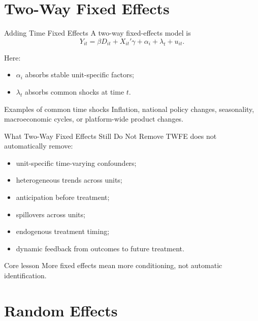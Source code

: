 \documentclass[aspectratio=169,11pt]{beamer}
\begin{document}
\section{Two-Way Fixed Effects}

\begin{frame}{Adding Time Fixed Effects}
A two-way fixed-effects model is
\[
Y_{it}=\beta D_{it}+X_{it}'\gamma+\alpha_i+\lambda_t+u_{it}.
\]

Here:
\begin{itemize}
\item \(\alpha_i\) absorbs stable unit-specific factors;
\item \(\lambda_t\) absorbs common shocks at time \(t\).
\end{itemize}

\begin{block}{Examples of common time shocks}
Inflation, national policy changes, seasonality, macroeconomic cycles, or platform-wide product changes.
\end{block}
\end{frame}

\begin{frame}{What Two-Way Fixed Effects Still Do Not Remove}
TWFE does not automatically remove:
\begin{itemize}
\item unit-specific time-varying confounders;
\item heterogeneous trends across units;
\item anticipation before treatment;
\item spillovers across units;
\item endogenous treatment timing;
\item dynamic feedback from outcomes to future treatment.
\end{itemize}

\begin{alertblock}{Core lesson}
More fixed effects mean more conditioning, not automatic identification.
\end{alertblock}
\end{frame}

\section{Random Effects}
\end{document}
